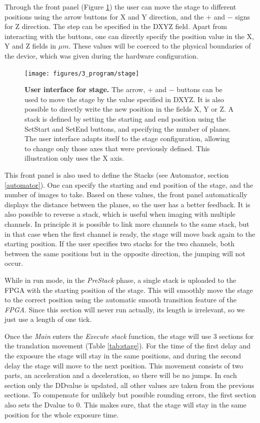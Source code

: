 \documentclass{diploma_style}
\begin{document}
Through the front panel (Figure \ref{fig:ui_stage}) the user can move the stage to different positions using the arrow buttons for X and Y direction, and the $+$ and $-$ signs for Z direction. The step can be specified in the DXYZ field. Apart from interacting with the buttons, one can directly specify the position value in the X, Y and Z fields in $\mu m$. These values will be coerced to the physical boundaries of the device, which was given during the hardware configuration.

\begin{figure}[htbp]
	\centering
	\texttt{[image: figures/3\_program/stage]}
	\caption{\textbf{User interface for stage.} The arrow, $+$ and $-$ buttons can be used to move the stage by the value specified in DXYZ. It is also possible to directly write the new position in the fields X, Y or Z. A stack is defined by setting the starting and end position using the SetStart and SetEnd buttons, and specifying the number of planes. The user interface adapts itself to the stage configuration, allowing to change only those axes that were previously defined. This illustration only uses the X axis.}
	\label{fig:ui_stage}
\end{figure}

This front panel is also used to define the Stacks (see Automator, section \ref{automator}). One can specify the starting and end position of the stage, and the number of images to take. Based on these values, the front panel automatically displays the distance between the planes, so the user has a better feedback. It is also possible to reverse a stack, which is useful when imaging with multiple channels. In principle it is possible to link more channels to the same stack, but in that case when the first channel is ready, the stage will move back again to the starting position. If the user specifies two stacks for the two channels, both between the same positions but in the opposite direction, the jumping will not occur.

While in run mode, in the \emph{PreStack} phase, a single stack is uploaded to the FPGA with the starting position of the stage. This will smoothly move the stage to the correct position using the automatic smooth transition feature of the \emph{FPGA}. Since this section will never run actually, its length is irrelevant, so we just use a length of one tick.

Once the \emph{Main} enters the \emph{Execute stack} function, the stage will use 3 sections for the translation movement (Table \ref{tab:stage}). For the time of the first delay and the exposure the stage will stay in the same positions, and during the second delay the stage will move to the next position. This movement consists of two parts, an acceleration and a deceleration, so there will be no jumps. In each section only the DDvalue is updated, all other values are taken from the previous sections. To compensate for unlikely but possible rounding errors, the first section also sets the Dvalue to 0. This makes sure, that the stage will stay in the same position for the whole exposure time.
\end{document}
